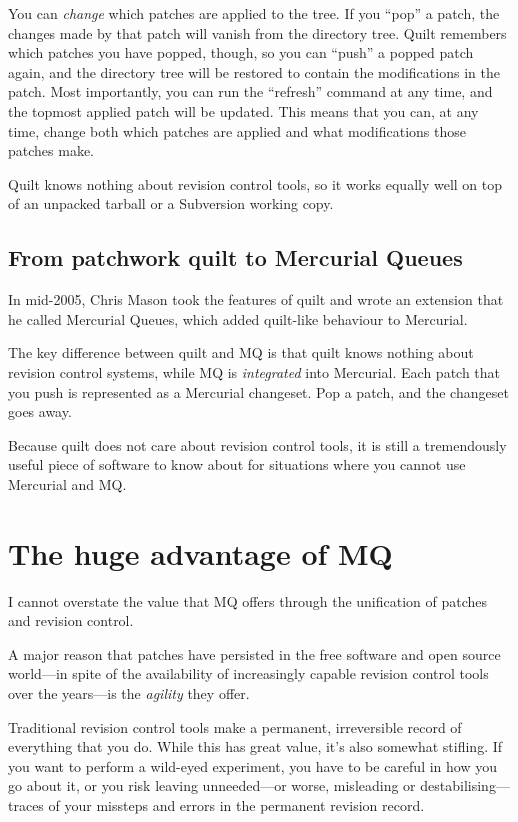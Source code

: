 You can \emph{change} which patches are applied to the tree.  If you
``pop'' a patch, the changes made by that patch will vanish from the
directory tree.  Quilt remembers which patches you have popped,
though, so you can ``push'' a popped patch again, and the directory
tree will be restored to contain the modifications in the patch.  Most
importantly, you can run the ``refresh'' command at any time, and the
topmost applied patch will be updated.  This means that you can, at
any time, change both which patches are applied and what
modifications those patches make.

Quilt knows nothing about revision control tools, so it works equally
well on top of an unpacked tarball or a Subversion working copy.

\subsection{From patchwork quilt to Mercurial Queues}
\label{sec:mq:quilt-mq}

In mid-2005, Chris Mason took the features of quilt and wrote an
extension that he called Mercurial Queues, which added quilt-like
behaviour to Mercurial.

The key difference between quilt and MQ is that quilt knows nothing
about revision control systems, while MQ is \emph{integrated} into
Mercurial.  Each patch that you push is represented as a Mercurial
changeset.  Pop a patch, and the changeset goes away.

Because quilt does not care about revision control tools, it is still
a tremendously useful piece of software to know about for situations
where you cannot use Mercurial and MQ.

\section{The huge advantage of MQ}

I cannot overstate the value that MQ offers through the unification of
patches and revision control.

A major reason that patches have persisted in the free software and
open source world---in spite of the availability of increasingly
capable revision control tools over the years---is the \emph{agility}
they offer.  

Traditional revision control tools make a permanent, irreversible
record of everything that you do.  While this has great value, it's
also somewhat stifling.  If you want to perform a wild-eyed
experiment, you have to be careful in how you go about it, or you risk
leaving unneeded---or worse, misleading or destabilising---traces of
your missteps and errors in the permanent revision record.

